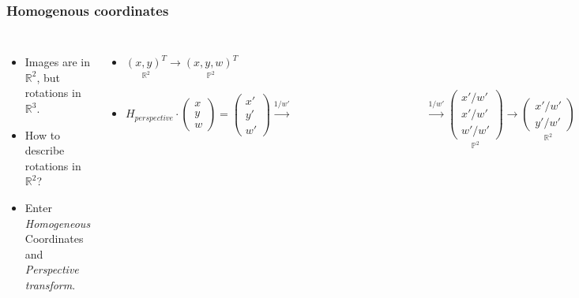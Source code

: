 \documentclass[9pt]{beamer}
\begin{document}
\subsubsection{Homogenous coordinates}
\begin{frame}
	\begin{columns}
		\begin{itemize}
			\item Images are in $\mathbb{R}^2$, but rotations in $\mathbb{R}^3$.
			\item How to describe rotations in $\mathbb{R}^2$?\\
			\item Enter \emph{Homogeneous} Coordinates and \emph{Perspective transform}.
		\end{itemize}
		\begin{itemize}
			\item $\underset{\mathbb{R}^2}{(x,y)^T} \rightarrow \underset{\mathbb{P}^2}{(x,y,w)^T}$
			\item $H_{perspective} 
				\cdot 
				\begin{pmatrix} 
					x \\ 
					y \\
					w 
				\end{pmatrix}=
				\begin{pmatrix} 
					x' \\
					y' \\
					w'
				\end{pmatrix} 
				\overset{1/w'}{\rightarrow} 
				\qquad 
				\qquad 
				\qquad 
				\qquad 
				\qquad 
				\qquad 
				\overset{1/w'}{\rightarrow} 
				\underset{\mathbb{P}^2}{
					\begin{pmatrix} 
						x'/w' \\
						x'/w'\\
						w'/w'
					\end{pmatrix}}
					\rightarrow 
					\underset{\mathbb{R}^2}{
						\begin{pmatrix} 
							x'/w' \\
							y'/w' 
						\end{pmatrix}}$
		\end{itemize}
	\end{columns}
\end{frame}
\end{document}
